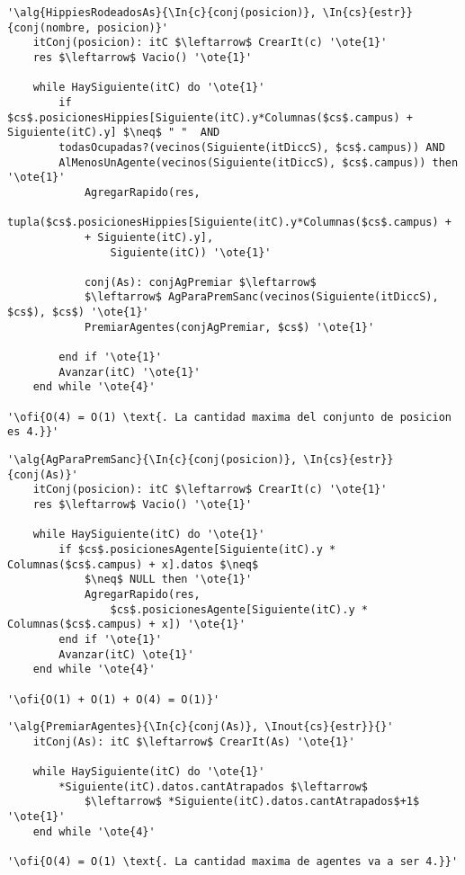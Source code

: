 \begin{lstlisting}[mathescape]
'\alg{HippiesRodeadosAs}{\In{c}{conj(posicion)}, \In{cs}{estr}}{conj(nombre, posicion)}'
	itConj(posicion): itC $\leftarrow$ CrearIt(c) '\ote{1}'
	res $\leftarrow$ Vacio() '\ote{1}'

	while HaySiguiente(itC) do '\ote{1}'
		if $cs$.posicionesHippies[Siguiente(itC).y*Columnas($cs$.campus) + Siguiente(itC).y] $\neq$ " "  AND 
		todasOcupadas?(vecinos(Siguiente(itDiccS), $cs$.campus)) AND 
		AlMenosUnAgente(vecinos(Siguiente(itDiccS), $cs$.campus)) then '\ote{1}'
			AgregarRapido(res, 
			tupla($cs$.posicionesHippies[Siguiente(itC).y*Columnas($cs$.campus) +
			+ Siguiente(itC).y], 
				Siguiente(itC)) '\ote{1}'

			conj(As): conjAgPremiar $\leftarrow$
			$\leftarrow$ AgParaPremSanc(vecinos(Siguiente(itDiccS), $cs$), $cs$) '\ote{1}'
			PremiarAgentes(conjAgPremiar, $cs$) '\ote{1}'

		end if '\ote{1}'
		Avanzar(itC) '\ote{1}'
	end while '\ote{4}'

'\ofi{O(4) = O(1) \text{. La cantidad maxima del conjunto de posicion es 4.}}'
\end{lstlisting}

\begin{lstlisting}[mathescape]
'\alg{AgParaPremSanc}{\In{c}{conj(posicion)}, \In{cs}{estr}}{conj(As)}'
	itConj(posicion): itC $\leftarrow$ CrearIt(c) '\ote{1}'
	res $\leftarrow$ Vacio() '\ote{1}'

	while HaySiguiente(itC) do '\ote{1}'
		if $cs$.posicionesAgente[Siguiente(itC).y * Columnas($cs$.campus) + x].datos $\neq$ 
			$\neq$ NULL then '\ote{1}'
			AgregarRapido(res, 
				$cs$.posicionesAgente[Siguiente(itC).y * Columnas($cs$.campus) + x]) '\ote{1}'
		end if '\ote{1}'
		Avanzar(itC) \ote{1}'
	end while '\ote{4}'

'\ofi{O(1) + O(1) + O(4) = O(1)}'
\end{lstlisting}

\begin{lstlisting}[mathescape]
'\alg{PremiarAgentes}{\In{c}{conj(As)}, \Inout{cs}{estr}}{}'
	itConj(As): itC $\leftarrow$ CrearIt(As) '\ote{1}'
	
	while HaySiguiente(itC) do '\ote{1}'
		*Siguiente(itC).datos.cantAtrapados $\leftarrow$
			$\leftarrow$ *Siguiente(itC).datos.cantAtrapados$+1$ '\ote{1}'
	end while '\ote{4}'

'\ofi{O(4) = O(1) \text{. La cantidad maxima de agentes va a ser 4.}}'
\end{lstlisting}

